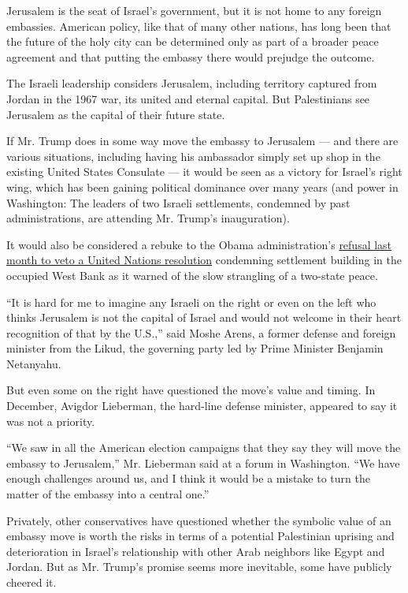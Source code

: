 Jerusalem is the seat of Israel's government, but it is not home to any
foreign embassies. American policy, like that of many other nations, has
long been that the future of the holy city can be determined only as
part of a broader peace agreement and that putting the embassy there
would prejudge the outcome.

The Israeli leadership considers Jerusalem, including territory captured
from Jordan in the 1967 war, its united and eternal capital. But
Palestinians see Jerusalem as the capital of their future state.

If Mr. Trump does in some way move the embassy to Jerusalem --- and
there are various situations, including having his ambassador simply set
up shop in the existing United States Consulate --- it would be seen as
a victory for Israel's right wing, which has been gaining political
dominance over many years (and power in Washington: The leaders of two
Israeli settlements, condemned by past administrations, are attending
Mr. Trump's inauguration).

It would also be considered a rebuke to the Obama administration's
\href{https://www.nytimes3xbfgragh.onion/2016/12/23/world/middleeast/israel-settlements-un-vote.html}{refusal
last month to veto a United Nations resolution} condemning settlement
building in the occupied West Bank as it warned of the slow strangling
of a two-state peace.

``It is hard for me to imagine any Israeli on the right or even on the
left who thinks Jerusalem is not the capital of Israel and would not
welcome in their heart recognition of that by the U.S.,'' said Moshe
Arens, a former defense and foreign minister from the Likud, the
governing party led by Prime Minister Benjamin Netanyahu.

But even some on the right have questioned the move's value and timing.
In December, Avigdor Lieberman, the hard-line defense minister, appeared
to say it was not a priority.

``We saw in all the American election campaigns that they say they will
move the embassy to Jerusalem,'' Mr. Lieberman said at a forum in
Washington. ``We have enough challenges around us, and I think it would
be a mistake to turn the matter of the embassy into a central one.''

Privately, other conservatives have questioned whether the symbolic
value of an embassy move is worth the risks in terms of a potential
Palestinian uprising and deterioration in Israel's relationship with
other Arab neighbors like Egypt and Jordan. But as Mr. Trump's promise
seems more inevitable, some have publicly cheered it.

